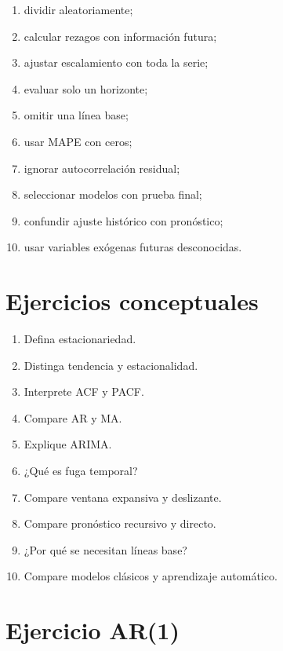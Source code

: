 \documentclass[
  spanish,
  10.5pt,
  letterpaper,
  DIV=11,
  numbers=noendperiod,
  oneside,
  open=any]{scrreprt}
\providecommand{\tightlist}{%
  \setlength{\itemsep}{0pt}\setlength{\parskip}{0pt}}
\theoremstyle{definition}
\theoremstyle{definition}
\theoremstyle{plain}
\theoremstyle{remark}
\begin{document}
\begin{enumerate}
\def\labelenumi{\arabic{enumi}.}
\tightlist
\item
  dividir aleatoriamente;
\item
  calcular rezagos con información futura;
\item
  ajustar escalamiento con toda la serie;
\item
  evaluar solo un horizonte;
\item
  omitir una línea base;
\item
  usar MAPE con ceros;
\item
  ignorar autocorrelación residual;
\item
  seleccionar modelos con prueba final;
\item
  confundir ajuste histórico con pronóstico;
\item
  usar variables exógenas futuras desconocidas.
\end{enumerate}

\section*{Ejercicios conceptuales}\label{ejercicios-conceptuales-19}


\begin{enumerate}
\def\labelenumi{\arabic{enumi}.}
\tightlist
\item
  Defina estacionariedad.
\item
  Distinga tendencia y estacionalidad.
\item
  Interprete ACF y PACF.
\item
  Compare AR y MA.
\item
  Explique ARIMA.
\item
  ¿Qué es fuga temporal?
\item
  Compare ventana expansiva y deslizante.
\item
  Compare pronóstico recursivo y directo.
\item
  ¿Por qué se necesitan líneas base?
\item
  Compare modelos clásicos y aprendizaje automático.
\end{enumerate}

\section*{Ejercicio AR(1)}\label{ejercicio-ar1}
\end{document}
